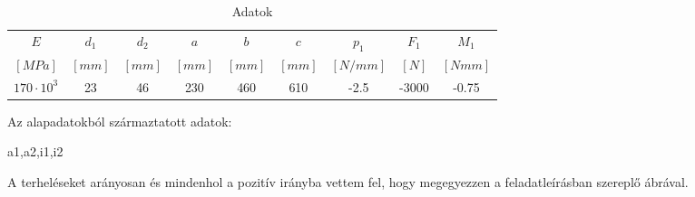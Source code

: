 \documentclass{article}
\begin{document}
	\begin{table}[h!]
		\begin{center}
			\caption{Adatok}
			\label{tab:table1}
			\begin{tabular}{c|c|c|c|c|c|c|c|c} %
				$E$ & $d_{1}$ & $d_{2}$ & $a$ & $b$ & $c$ & $p_{1}$ & $F_{1}$ & $M_{1}$ \\
				$[MPa]$ & $[mm]$ & $[mm]$ & $[mm]$ & $[mm]$ & $[mm]$ & $[N/mm]$ & $[N]$ & $[Nmm]$\\
				\hline
				$170\cdot10^3$ & 23 & 46 & 230 & 460 & 610 & -2.5 & -3000 & -0.75\\
			\end{tabular}
		\end{center}
	\end{table}

	Az alapadatokból származtatott adatok:
	
	a1,a2,i1,i2
	
	\begin{flushleft}
		A terheléseket arányosan és mindenhol a pozitív irányba vettem fel, hogy megegyezzen a feladatleírásban szereplő ábrával.
	\end{flushleft}
	
	\newcommand{\degy}{8}
	\newcommand{\dketto}{16}
	
\end{document}
